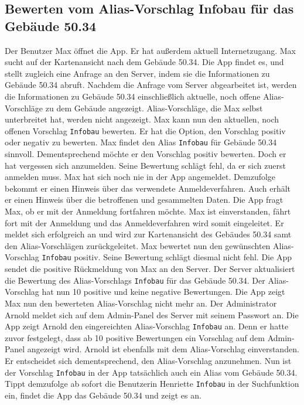 \subsection{Bewerten vom Alias-Vorschlag Infobau für das Gebäude 50.34}

Der Benutzer Max öffnet die App.
Er hat außerdem aktuell Internetzugang.
Max sucht auf der \Gls{Kartenansicht} nach dem Gebäude 50.34.
Die App findet es, und stellt zugleich eine Anfrage an den \Gls{Server}, indem sie die Informationen zu Gebäude 50.34 abruft.
Nachdem die Anfrage vom \Gls{Server} abgearbeitet ist, werden die Informationen zu Gebäude 50.34 einschließlich aktuelle, noch offene \Gls{Alias}-Vorschläge zu dem Gebäude angezeigt.
\Gls{Alias}-Vorschläge, die Max selbst unterbreitet hat, werden nicht angezeigt.
Max kann nun den aktuellen, noch offenen Vorschlag \texttt{Infobau} bewerten.
Er hat die Option, den Vorschlag positiv oder negativ zu bewerten.
Max findet den \Gls{Alias} \texttt{Infobau} für Gebäude 50.34 sinnvoll.
Dementsprechend möchte er den Vorschlag positiv bewerten.
Doch er hat vergessen sich anzumelden.
Seine Bewertung schlägt fehl, da er sich zuerst anmelden muss.
Max hat sich noch nie in der App angemeldet.
Demzufolge bekommt er einen Hinweis über das verwendete Anmeldeverfahren.
Auch erhält er einen Hinweis über die betroffenen und gesammelten Daten.
Die App fragt Max, ob er mit der Anmeldung fortfahren möchte.
Max ist einverstanden, fährt fort mit der Anmeldung und das Anmeldeverfahren wird somit eingeleitet.
Er meldet sich erfolgreich an und wird zur \Gls{Kartenansicht} des Gebäudes 50.34 samt den \Gls{Alias}-Vorschlägen zurückgeleitet.
Max bewertet nun den gewünschten \Gls{Alias}-Vorschlag \texttt{Infobau} positiv.
Seine Bewertung schlägt diesmal nicht fehl.
Die App sendet die positive Rückmeldung von Max an den \Gls{Server}.
Der \Gls{Server} aktualisiert die Bewertung des \Gls{Alias}-Vorschlags \texttt{Infobau} für das Gebäude 50.34.
Der \Gls{Alias}-Vorschlag hat nun 10 positive und keine negative Bewertungen.
Die App zeigt Max nun den bewerteten \Gls{Alias}-Vorschlag nicht mehr an.
Der Administrator Arnold meldet sich auf dem \Gls{Admin-Panel} des \Gls{Server} mit seinem Passwort an.
Die App zeigt Arnold den eingereichten \Gls{Alias}-Vorschlag \texttt{Infobau} an.
Denn er hatte zuvor festgelegt, dass ab 10 positive Bewertungen ein Vorschlag auf dem \Gls{Admin-Panel} angezeigt wird.
Arnold ist ebenfalls mit dem \Gls{Alias}-Vorschlag einverstanden.
Er entscheidet sich dementsprechend, den \Gls{Alias}-Vorschlag anzunehmen.
Nun ist der Vorschlag \texttt{Infobau} in der App tatsächlich auch ein \Gls{Alias} vom Gebäude 50.34.
Tippt demzufolge ab sofort die Benutzerin Henriette \texttt{Infobau} in der Suchfunktion ein, findet die App das Gebäude 50.34 und zeigt es an.